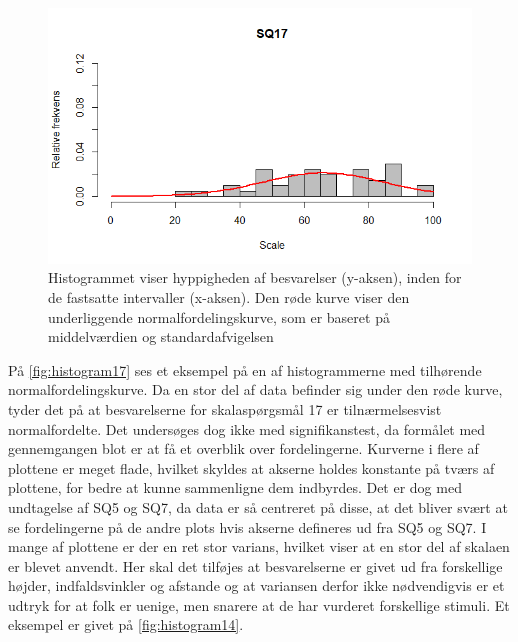 \begin{figure}[H]
\centering
\includegraphics[width = \textwidth]{Figure/DatabehandlingSkalaer/HistogramNormalFordeling/SQ17} 
\caption{Histogrammet viser hyppigheden af besvarelser (y-aksen), inden for de fastsatte intervaller (x-aksen). Den røde kurve viser den underliggende normalfordelingskurve, som er baseret på middelværdien og standardafvigelsen}
\label{fig:histogram17}
\end{figure}
\noindent
%
På \autoref{fig:histogram17} ses et eksempel på en af histogrammerne med tilhørende normalfordelingskurve. Da en stor del af data befinder sig under den røde kurve, tyder det på at besvarelserne for skalaspørgsmål 17 er tilnærmelsesvist normalfordelte. Det undersøges dog ikke med signifikanstest, da formålet med gennemgangen blot er at få et overblik over fordelingerne.\blankline
%
Kurverne i flere af plottene er meget flade, hvilket skyldes at akserne holdes konstante på tværs af plottene, for bedre at kunne sammenligne dem indbyrdes. Det er dog med undtagelse af SQ5 og SQ7, da data er så centreret på disse, at det bliver svært at se fordelingerne på de andre plots hvis akserne defineres ud fra SQ5 og SQ7.\blankline
%
I mange af plottene er der en ret stor varians, hvilket viser at en stor del af skalaen er blevet anvendt. Her skal det tilføjes at besvarelserne er givet ud fra forskellige højder, indfaldsvinkler og afstande og at variansen derfor ikke nødvendigvis er et udtryk for at folk er uenige, men snarere at de har vurderet forskellige stimuli. Et eksempel er givet på \autoref{fig:histogram14}.\blankline
%
